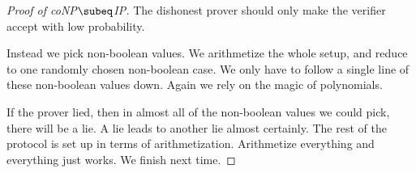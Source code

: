 \begin{proof}[Proof of coNP$\subeq$IP]
The dishonest prover should only make the verifier accept with low probability.

Instead we pick non-boolean values. We arithmetize the whole setup, and reduce to one randomly chosen non-boolean case. We only have to follow a single line of these non-boolean values down. Again we rely on the magic of polynomials.

If the prover lied, then in almost all of the non-boolean values we could pick, there will be a lie. A lie leads to another lie almost certainly. The rest of the protocol is set up in terms of arithmetization. Arithmetize everything and everything just works. We finish next time.
\end{proof}